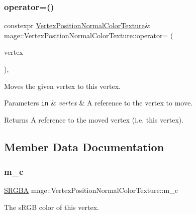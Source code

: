 \subsubsection{\texorpdfstring{operator=()}{operator=()}\hspace{0.1cm}{\footnotesize\ttfamily [2/2]}}
{\footnotesize\ttfamily constexpr \hyperlink{structmage_1_1_vertex_position_normal_color_texture}{Vertex\+Position\+Normal\+Color\+Texture}\& mage\+::\+Vertex\+Position\+Normal\+Color\+Texture\+::operator= (\begin{DoxyParamCaption}\item[{\hyperlink{structmage_1_1_vertex_position_normal_color_texture}{Vertex\+Position\+Normal\+Color\+Texture} \&\&}]{vertex }\end{DoxyParamCaption})\hspace{0.3cm}{\ttfamily [default]}, {\ttfamily [noexcept]}}

Moves the given vertex to this vertex.


\begin{DoxyParams}[1]{Parameters}
\mbox{\tt in}  & {\em vertex} & A reference to the vertex to move. \\
\hline
\end{DoxyParams}
\begin{DoxyReturn}{Returns}
A reference to the moved vertex (i.\+e. this vertex). 
\end{DoxyReturn}


\subsection{Member Data Documentation}
\hypertarget{structmage_1_1_vertex_position_normal_color_texture_a241873e111ffd017acc2a248bd72c1c6}{}\label{structmage_1_1_vertex_position_normal_color_texture_a241873e111ffd017acc2a248bd72c1c6} 
\subsubsection{\texorpdfstring{m\+\_\+c}{m\_c}}
{\footnotesize\ttfamily \hyperlink{structmage_1_1_s_r_g_b_a}{S\+R\+G\+BA} mage\+::\+Vertex\+Position\+Normal\+Color\+Texture\+::m\+\_\+c}

The s\+R\+GB color of this vertex. \hypertarget{structmage_1_1_vertex_position_normal_color_texture_a2ee881cac4d5676cd3806e346231a280}{}\label{structmage_1_1_vertex_position_normal_color_texture_a2ee881cac4d5676cd3806e346231a280} 

